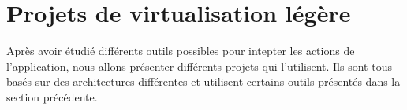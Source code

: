 \section{Projets de virtualisation légère}
\label{section:sota}

Après avoir étudié différents outils possibles pour intepter les actions de l'application, nous allons présenter différents projets qui l'utilisent. Ils sont tous basés sur des architectures différentes et utilisent certains outils présentés dans la section précédente.
